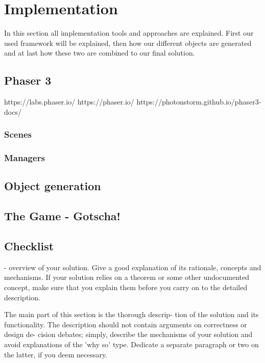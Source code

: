 
\chapter{Implementation}
\label{chap:implementation}

In this section all implementation tools and approaches are explained.
First our used framework will be explained, then how our different objects are generated and
at last how these two are combined to our final solution.


\section{Phaser 3}
https://labs.phaser.io/
https://phaser.io/
https://photonstorm.github.io/phaser3-docs/

\subsection{Scenes}
\subsection{Managers}
\section{Object generation}

\section{The Game - Gotscha!}

\section{Checklist}

- overview of your solution. Give a good explanation of its rationale,
concepts and mechanisms. If your solution relies on a
theorem or some other undocumented concept, make sure
that you explain them before you carry on to the detailed
description.

The main part of this section is the thorough descrip-
tion of the solution and its functionality.
The description should not contain arguments on correctness or design de-
cision debates; simply, describe the mechanisms of your
solution and avoid explanations of the 'why so' type.
Dedicate a separate paragraph or two on the latter, if
you deem necessary.

